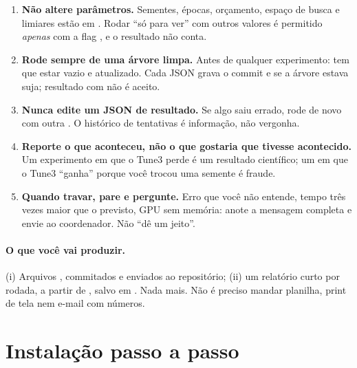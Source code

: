 \begin{alerta}
\begin{enumerate}[leftmargin=*]
\item \textbf{Não altere parâmetros.} Sementes, épocas, orçamento, espaço de busca e limiares estão em . Rodar ``só para ver'' com outros valores é permitido \emph{apenas} com a flag , e o resultado não conta.
\item \textbf{Rode sempre de uma árvore limpa.} Antes de qualquer experimento:  tem que estar vazio e  atualizado. Cada JSON grava o commit e se a árvore estava suja; resultado com  não é aceito.
\item \textbf{Nunca edite um JSON de resultado.} Se algo saiu errado, rode de novo com outra . O histórico de tentativas é informação, não vergonha.
\item \textbf{Reporte o que aconteceu, não o que gostaria que tivesse acontecido.} Um experimento em que o Tune3 perde é um resultado científico; um em que o Tune3 ``ganha'' porque você trocou uma semente é fraude.
\item \textbf{Quando travar, pare e pergunte.} Erro que você não entende, tempo três vezes maior que o previsto, GPU sem memória: anote a mensagem completa e envie ao coordenador. Não ``dê um jeito''.
\end{enumerate}
\end{alerta}

\paragraph{O que você vai produzir.} (i) Arquivos , commitados e enviados ao repositório; (ii) um relatório curto por rodada, a partir de , salvo em . Nada mais. Não é preciso mandar planilha, print de tela nem e-mail com números.

\section{Instalação passo a passo}

